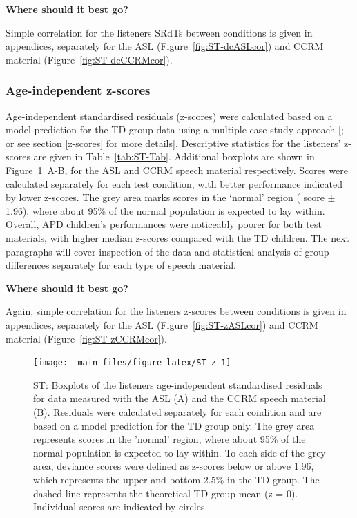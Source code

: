 \documentclass[a4paper, twoside]{templates/ociamthesis}
\begin{document}
\begin{correction}
\textbf{Where should it best go?}

Simple correlation for the listeners SRdTs between conditions is given
in appendices, separately for the ASL (Figure~\ref{fig:ST-dcASLcor}) and
CCRM material (Figure~\ref{fig:ST-dcCCRMcor}).
\end{correction}

\hypertarget{age-independent-z-scores}{%
\subsubsection*{Age-independent z-scores}\label{age-independent-z-scores}}

Age-independent standardised residuals (z-scores) were calculated based on a model prediction for the TD group data using a multiple-case study approach {[}\textcite{Ramus2003}; or see section \ref{z-scores} for more details{]}. Descriptive statistics for the listeners' z-scores are given in Table~\ref{tab:ST-Tab}. Additional boxplots are shown in Figure~\ref{fig:ST-z}~A-B, for the ASL and CCRM speech material respectively. Scores were calculated separately for each test condition, with better performance indicated by lower z-scores. The grey area marks scores in the `normal' region (\textbar{} score \textbar{} \(\pm\) 1.96), where about 95\% of the normal population is expected to lay within. Overall, APD children's performances were noticeably poorer for both test materials, with higher median z-scores compared with the TD children. The next paragraphs will cover inspection of the data and statistical analysis of group differences separately for each type of speech material.\\

\begin{correction}
\textbf{Where should it best go?}

Again, simple correlation for the listeners z-scores between conditions
is given in appendices, separately for the ASL
(Figure~\ref{fig:ST-zASLcor}) and CCRM material
(Figure~\ref{fig:ST-zCCRMcor}).
\end{correction}

\begin{figure}

{\centering \texttt{[image: \_main\_files/figure-latex/ST-z-1]} 

}

\caption{ST: Boxplots of the listeners age-independent standardised residuals for data measured with the ASL (A) and the CCRM speech material (B). Residuals were calculated separately for each condition and are based on a model prediction for the TD group only. The grey area represents scores in the 'normal' region, where about 95\% of the normal population is expected to lay within. To each side of the grey area, deviance scores were defined as z-scores below or above 1.96, which represents the upper and bottom 2.5\% in the TD group. The dashed line represents the theoretical TD group mean (z = 0). Individual scores are indicated by circles.}\label{fig:ST-z}
\end{figure}
\end{document}
